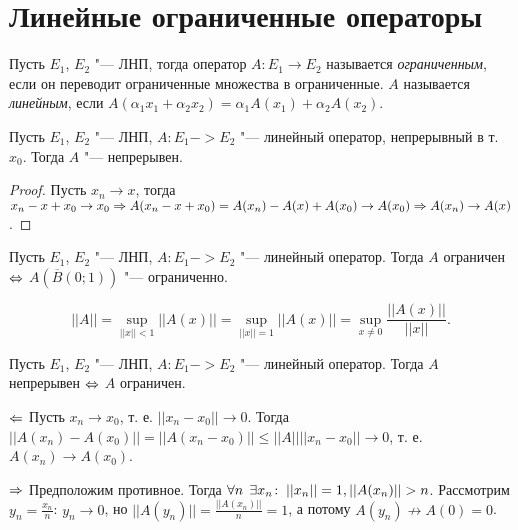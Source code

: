 \documentclass[main]{subfiles}
\begin{document}
\section{Линейные ограниченные операторы}

\begin{definition}
  Пусть \( E_1 \), \( E_2 \) "--- ЛНП,
  тогда оператор \( A : E_1 \to E_2 \) называется
  \emph{ограниченным}, если он переводит ограниченные
  множества в ограниченные. \( A \) называется
  \emph{линейным}, если \( A(\alpha_1 x_1 + \alpha_2 x_2)
  = \alpha_1 A(x_1) + \alpha_2 A(x_2) \).
\end{definition}

\begin{proposition}
  Пусть \( E_1 \), \( E_2 \) "--- ЛНП, \( A : E_1 -> E_2 \) "---
  линейный оператор, непрерывный в т. \( x_0 \).
  Тогда \( A \) "--- непрерывен.
\end{proposition}
\begin{proof}
  Пусть \( x_n \to x \), тогда \( x_n - x + x_0 \to x_0 \Rightarrow
  A(x_n - x + x_0) = A(x_n) - A(x) + A(x_0) \to A(x_0) \Rightarrow
  A(x_n) \to A(x) \).
\end{proof}

\begin{proposition}
  Пусть \( E_1 \), \( E_2 \) "--- ЛНП, \( A : E_1 -> E_2 \) "---
  линейный оператор.
  Тогда \( A \) ограничен \( \Leftrightarrow \) \( A(\overline{B}(0; 1)) \) "---
  ограниченно.
\end{proposition}

\begin{lemma}
  \[ ||A|| = \sup_{||x|| < 1} ||A(x)|| = \sup_{||x|| = 1} ||A(x)|| =
  \sup_{x \ne 0} \frac{||A(x)||}{||x||}. \]
\end{lemma}

\begin{theorem}
  Пусть \( E_1 \), \( E_2 \) "--- ЛНП, \( A : E_1 -> E_2 \) "---
  линейный оператор. Тогда \( A \) непрерывен \( \Leftrightarrow \)
  \( A \) ограничен.
\end{theorem}
\begin{itemproof}
  \item[\(\Leftarrow\)] Пусть \( x_n \to x_0 \), т. е. \( ||x_n - x_0|| \to 0 \).
    Тогда \( ||A(x_n) - A(x_0)|| = ||A(x_n - x_0)|| \le ||A|| ||x_n - x_0||
    \to 0 \), т. е. \( A(x_n) \to A(x_0) \).
  \item[$\Rightarrow$]
    Предположим противное. Тогда \( \forall {n} \; \, \exists x_n \colon \: ||x_n|| = 1,
    ||A(x_n)|| > n \). Рассмотрим \( y_n = \frac{x_n}{n} \):
    \( y_n \to 0 \), но \( ||A(y_n)|| = \frac{||A(x_n)||}{n} = 1 \),
    а потому \( A(y_n) \not \to A(0) = 0 \).
\end{itemproof}
\end{document}
